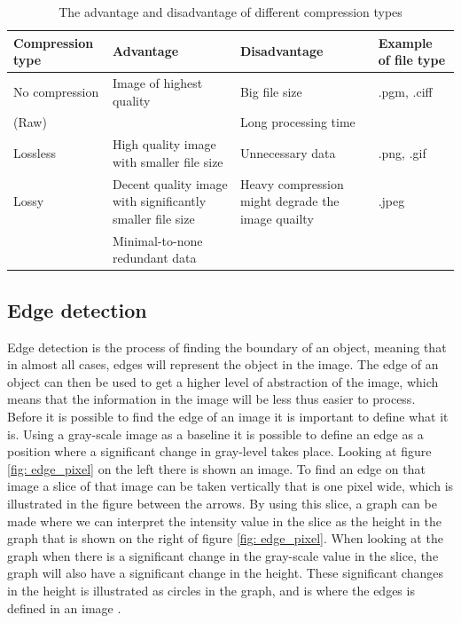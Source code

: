 \begin{table}[H]
\centering
\begin{tabular}{ | p{2.85cm} | p{5.1cm} | p{3.3cm} | p{2.0cm} | }
\hline
\rowcolor{gray!25}
\textbf{Compression type}       & \textbf{Advantage}                                  & \textbf{Disadvantage}              & \textbf{Example of file type}         \\ \hline
No compression                  & Image of highest quality                      &  Big file size            &  .pgm, .ciff                          \\ 
(Raw)                           &                                               &  Long processing time     &                                       \\ \hline
Lossless                        & High quality image with smaller file size     &  Unnecessary data         &  .png, .gif                           \\ \hline
Lossy                           & Decent quality image with significantly smaller file size     & Heavy compression might degrade the image quailty  & .jpeg  \\
                                & Minimal-to-none redundant data                &                           &                                       \\ \hline                                              
\end{tabular}%
\caption{The advantage and disadvantage of different compression types}
\label{tab:ProConsFileFormat}
\end{table}


\subsection{Edge detection}
Edge detection is the process of finding the boundary of an object, meaning that in almost all cases, edges will represent the object in the image. The edge of an object can then be used to get a higher level of abstraction of the image, which means that the information in the image will be less thus easier to process. Before it is possible to find the edge of an image it is important to define what it is. Using a gray-scale image as a baseline it is possible to define an edge as a position where a significant change in gray-level takes place. Looking at figure \ref{fig: edge_pixel} on the left there is shown an image. To find an edge on that image a slice of that image can be taken vertically that is one pixel wide, which is illustrated in the figure between the arrows. By using this slice, a graph can be made where we can interpret the intensity value in the slice as the height in the graph that is shown on the right of figure \ref{fig: edge_pixel}. When looking at the graph when there is a significant change in the gray-scale value in the slice, the graph will also have a significant change in the height. These significant changes in the height is illustrated as circles in the graph, and is where the edges is defined in an image \citep[ Chapter~5.2.2]{book:Moeslund}.


